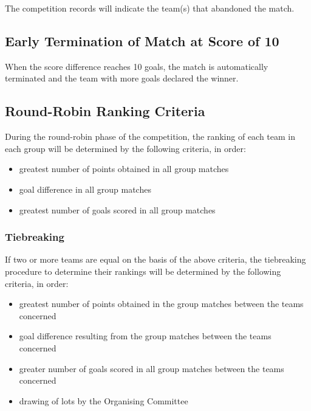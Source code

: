 The competition records will indicate the team(s) that abandoned the match.

\subsection{Early Termination of Match at Score of 10}

When the score difference reaches 10 goals, the match is automatically terminated and the team with more goals declared the winner.

\subsection{Round-Robin Ranking Criteria}

During the round-robin phase of the competition, the ranking of each team in each group will be determined by the following criteria, in order:
\begin{itemize}
\item greatest number of points obtained in all group matches
\item goal difference in all group matches
\item greatest number of goals scored in all group matches
\end{itemize}

\subsubsection{Tiebreaking}
If two or more teams are equal on the basis of the above criteria, the tiebreaking procedure to determine their rankings will be determined by the following criteria, in order:
\begin{itemize}
\item greatest number of points obtained in the group matches between the teams concerned
\item goal difference resulting from the group matches between the teams concerned
\item greater number of goals scored in all group matches between the teams concerned
\item drawing of lots by the Organising Committee
\end{itemize}
